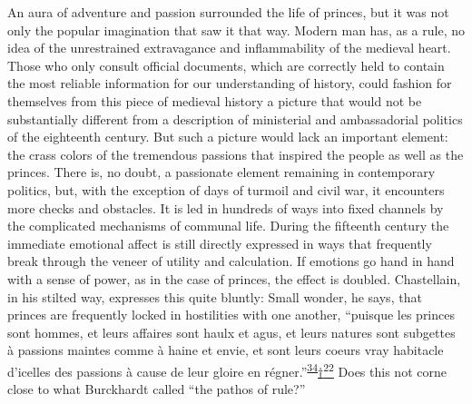 An aura of adventure and passion surrounded the life of princes, but it
was not only the popular imagination that saw it that way. Modern man
has, as a rule, no idea of the unrestrained extravagance and
inflammability of the medieval heart. Those who only consult official
documents, which are correctly held to contain the most reliable
information for our understanding of history, could fashion for
themselves from this piece of medieval history a picture that would not
be substantially different from a description of ministerial and
ambassadorial politics of the eighteenth century. But such a picture
would lack an important element: the crass colors of the tremendous
passions that inspired the people as well as the princes. There is, no
doubt, a passionate element remaining in contemporary politics, but,
with the exception of days of turmoil and civil war, it encounters more
checks and obstacles. It is led in hundreds of ways into fixed channels
by the complicated mechanisms of communal life. During the fifteenth
century the immediate emotional affect is still directly expressed in
ways that frequently break through the veneer of utility and
calculation. If emotions go hand in hand with a sense of power, as in
the case of princes, the effect is doubled. Chastellain, in his stilted
way, expresses this quite bluntly: Small wonder, he says, that princes
are frequently locked in hostilities with one another, ``puisque les
princes sont hommes, et leurs affaires sont haulx et agus, et leurs
natures sont subgettes à passions maintes comme à haine et envie, et
sont leurs coeurs vray habitacle d'icelles des passions à cause de leur
gloire en
régner.''\textsuperscript{\protect\hypertarget{08_Chapter_One__THE_PASSIONATE_INTE.xhtmlux5cux23id_2163}{\protect\hyperlink{23_NOTES.xhtmlux5cux23id_2164}{34}}}\protect\hypertarget{08_Chapter_One__THE_PASSIONATE_INTE.xhtmlux5cux23id_2286}{\protect\hyperlink{23_NOTES.xhtmlux5cux23id_2291}{†\textsuperscript{22}}}
Does this not corne close to what Burckhardt called ``the pathos of
rule?''

